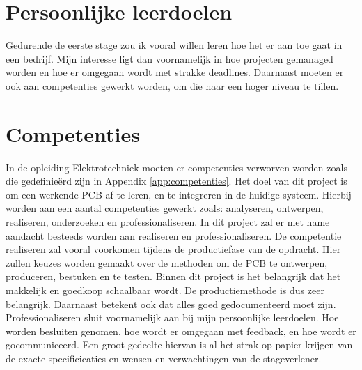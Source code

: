 
\section{Persoonlijke leerdoelen}
Gedurende de eerste stage zou ik vooral willen leren hoe het er aan toe gaat in een bedrijf. Mijn interesse ligt dan voornamelijk in hoe projecten gemanaged worden en hoe er omgegaan wordt met strakke deadlines. Daarnaast moeten er ook aan competenties gewerkt worden, om die naar een hoger niveau te tillen.

\section{Competenties}
In de opleiding Elektrotechniek moeten er competenties verworven worden zoals die gedefinieërd zijn in Appendix \ref{app:competenties}. 
\newline
Het doel van dit project is om een werkende PCB af te leren, en te integreren in de huidige systeem. Hierbij worden aan een aantal competenties gewerkt zoals: analyseren, ontwerpen, realiseren, onderzoeken en professionaliseren. In dit project zal er met name aandacht besteeds worden aan realiseren en professionaliseren. 
\newline
De competentie realiseren zal vooral voorkomen tijdens de productiefase van de opdracht. Hier zullen keuzes worden gemaakt over de methoden om de PCB te ontwerpen, produceren, bestuken en te testen. Binnen dit project is het belangrijk dat het makkelijk en goedkoop schaalbaar wordt. De productiemethode is dus zeer belangrijk. Daarnaast betekent ook dat alles goed gedocumenteerd moet zijn. 
\newline
Professionaliseren sluit voornamelijk aan bij mijn persoonlijke leerdoelen. Hoe worden besluiten genomen, hoe wordt er omgegaan met feedback, en hoe wordt er gocommuniceerd. Een groot gedeelte hiervan is al het strak op papier krijgen van de exacte specificicaties en wensen en verwachtingen van de stageverlener. 
